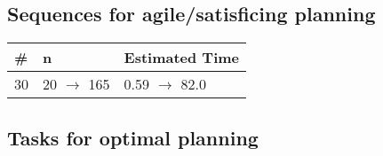 \documentclass{article}
\begin{document}
                         \subsection*{Sequences for agile/satisficing planning}

                        \begin{center}
                        \begin{tabular}{@{}l|l|l@{}}
                        \# & n & Estimated Time\\\midrule
                        30&20 $\rightarrow$ 165&0.59 $\rightarrow$ 82.0
                        \end{tabular}
                        \end{center}
                    
                                \subsection*{Tasks for optimal planning}
                                
\end{document}
